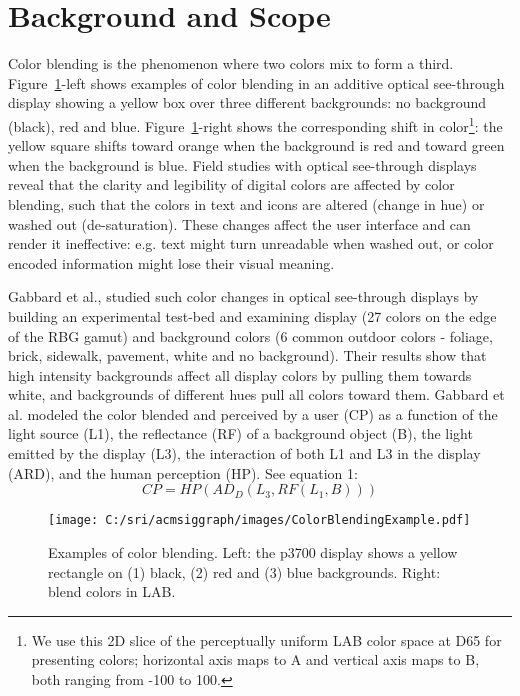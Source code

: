 \documentclass[annual]{acmsiggraph}
\begin{document}
\section{Background and Scope}

Color blending is the phenomenon where two colors mix to form a third. Figure~\ref{fig:Figure2}-left shows examples of color blending in an additive optical see-through display showing a yellow box over three different backgrounds: no background (black), red and blue. Figure~\ref{fig:Figure2}-right shows the corresponding shift in color\footnote{We use this 2D slice of the perceptually uniform LAB color space at D65 for presenting colors; horizontal axis maps to A and vertical axis maps to B, both ranging from -100 to 100.}: the yellow square shifts toward orange when the background is red and toward green when the background is blue. Field studies with optical see-through displays reveal that the clarity and legibility of digital colors are affected by color blending, such that the colors in text and icons are altered (change in hue) or washed out (de-saturation)\cite{Pingel:2005}. These changes affect the user interface and can render it ineffective: e.g. text might turn unreadable when washed out, or color encoded information might lose their visual meaning.

Gabbard et al., studied such color changes in optical see-through displays by building an experimental test-bed and examining display (27 colors on the edge of the RBG gamut) and background colors (6 common outdoor colors - foliage, brick, sidewalk, pavement, white and no background). Their results show that high intensity backgrounds affect all display colors by pulling them towards white, and backgrounds of different hues pull all colors toward them. Gabbard et al.  modeled the color blended and perceived by a user (CP) as a function of the light source (L1), the reflectance (RF) of a background object (B), the light emitted by the display (L3), the interaction of both L1 and L3 in the display (ARD), and the human perception (HP). See equation 1:
\begin{equation}
CP=HP(AD_{D}(L_{3},RF(L_{1},B)))
\end{equation}

\begin{figure}[ht]
  \centering
  \texttt{[image: C:/sri/acmsiggraph/images/ColorBlendingExample.pdf]}
  \caption{Examples of color blending. Left: the p3700 display shows a yellow rectangle on (1) black, (2) red and (3) blue backgrounds. Right: blend colors in LAB.}
  \label{fig:Figure2}
\end{figure}
\end{document}
